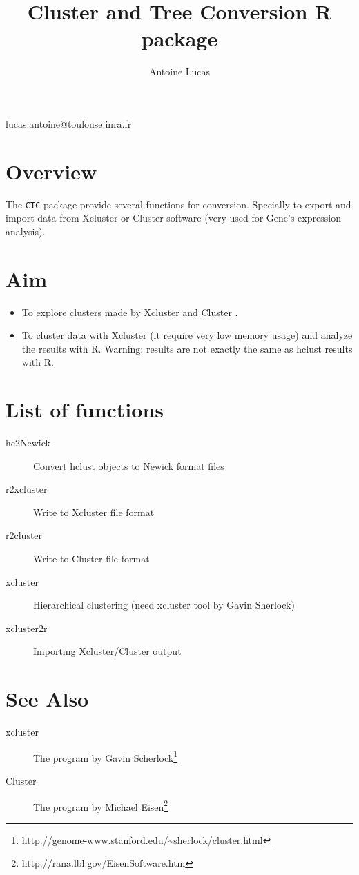 \documentclass{article}
\title{\bf Cluster and Tree Conversion R package}
\author{Antoine Lucas}
\begin{document}
\maketitle

\begin{center}
lucas.antoine@toulouse.inra.fr
\end{center}

\section{Overview}

The {\tt CTC} package provide several functions for 
conversion. Specially to export and import data from
Xcluster or Cluster software (very used for Gene's expression
analysis).

\section{Aim} 

\begin{itemize}
\item To explore clusters made by Xcluster and Cluster . 

\item To cluster data with Xcluster (it require very low memory usage) and analyze the results with R. Warning: results are not exactly the same
as hclust results with R. 
\end{itemize}              
       
\section{List of functions}

\begin{description}
\item[hc2Newick] Convert hclust objects to Newick format files
\item[r2xcluster] Write to Xcluster file format 
 \item[r2cluster] Write to Cluster file format 
\item[xcluster] Hierarchical clustering (need xcluster tool  by Gavin Sherlock) 
\item[xcluster2r] Importing Xcluster/Cluster output 
\end{description}                 
    
\section{See Also}
\begin{description}
\item[xcluster]
The program  by Gavin Scherlock\footnote{http://genome-www.stanford.edu/\~\/sherlock/cluster.html} 
 \item[Cluster]
 The program  by Michael Eisen\footnote{http://rana.lbl.gov/EisenSoftware.htm} 
\end{description}                 
\end{document}

